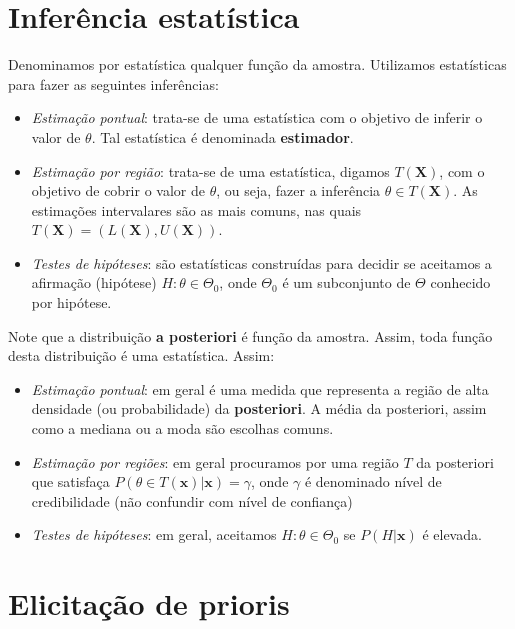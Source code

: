 \documentclass[
  letterpaper,
  DIV=11,
  numbers=noendperiod]{scrreprt}
\theoremstyle{definition}
\theoremstyle{definition}
\theoremstyle{remark}
\begin{document}
\hypertarget{inferuxeancia-estatuxedstica}{%
\section{Inferência estatística}\label{inferuxeancia-estatuxedstica}}

Denominamos por estatística qualquer função da amostra. Utilizamos
estatísticas para fazer as seguintes inferências:

\begin{itemize}
\item
  \emph{Estimação pontual}: trata-se de uma estatística com o objetivo
  de inferir o valor de \(\theta\). Tal estatística é denominada
  \textbf{estimador}.
\item
  \emph{Estimação por região}: trata-se de uma estatística, digamos
  \(T(\boldsymbol{X})\), com o objetivo de cobrir o valor de \(\theta\),
  ou seja, fazer a inferência \(\theta\in T(\boldsymbol{X})\). As
  estimações intervalares são as mais comuns, nas quais
  \(T(\boldsymbol{X})=(L(\boldsymbol{X}),U(\boldsymbol{X}))\).
\item
  \emph{Testes de hipóteses}: são estatísticas construídas para decidir
  se aceitamos a afirmação (hipótese) \(H:\theta\in \Theta_0\), onde
  \(\Theta_0\) é um subconjunto de \(\Theta\) conhecido por hipótese.
\end{itemize}

Note que a distribuição \textbf{a posteriori} é função da amostra.
Assim, toda função desta distribuição é uma estatística. Assim:

\begin{itemize}
\item
  \emph{Estimação pontual}: em geral é uma medida que representa a
  região de alta densidade (ou probabilidade) da \textbf{posteriori}. A
  média da posteriori, assim como a mediana ou a moda são escolhas
  comuns.
\item
  \emph{Estimação por regiões}: em geral procuramos por uma região \(T\)
  da posteriori que satisfaça
  \(P(\theta\in T(\boldsymbol{x})|\boldsymbol{x})=\gamma\), onde
  \(\gamma\) é denominado nível de credibilidade (não confundir com
  nível de confiança)
\item
  \emph{Testes de hipóteses}: em geral, aceitamos
  \(H:\theta\in\Theta_0\) se \(P(H|\boldsymbol{x})\) é elevada.
\end{itemize}

\hypertarget{elicitauxe7uxe3o-de-prioris}{%
\section{\texorpdfstring{Elicitação de
\textbf{prioris}}{Elicitação de prioris}}\label{elicitauxe7uxe3o-de-prioris}}
\end{document}
